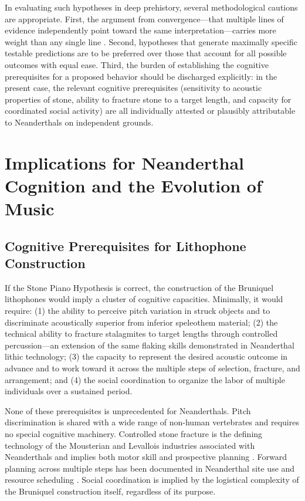 \documentclass[12pt]{article}
\begin{document}
In evaluating such hypotheses in deep prehistory, several methodological cautions are appropriate. First, the argument from convergence—that multiple lines of evidence independently point toward the same interpretation—carries more weight than any single line \citep{Wylie1989}. Second, hypotheses that generate maximally specific testable predictions are to be preferred over those that account for all possible outcomes with equal ease. Third, the burden of establishing the cognitive prerequisites for a proposed behavior should be discharged explicitly: in the present case, the relevant cognitive prerequisites (sensitivity to acoustic properties of stone, ability to fracture stone to a target length, and capacity for coordinated social activity) are all individually attested or plausibly attributable to Neanderthals on independent grounds.

\section{Implications for Neanderthal Cognition and the Evolution of Music}

\subsection{Cognitive Prerequisites for Lithophone Construction}

If the Stone Piano Hypothesis is correct, the construction of the Bruniquel lithophones would imply a cluster of cognitive capacities. Minimally, it would require: (1) the ability to perceive pitch variation in struck objects and to discriminate acoustically superior from inferior speleothem material; (2) the technical ability to fracture stalagmites to target lengths through controlled percussion—an extension of the same flaking skills demonstrated in Neanderthal lithic technology; (3) the capacity to represent the desired acoustic outcome in advance and to work toward it across the multiple steps of selection, fracture, and arrangement; and (4) the social coordination to organize the labor of multiple individuals over a sustained period.

None of these prerequisites is unprecedented for Neanderthals. Pitch discrimination is shared with a wide range of non-human vertebrates and requires no special cognitive machinery. Controlled stone fracture is the defining technology of the Mousterian and Levallois industries associated with Neanderthals and implies both motor skill and prospective planning \citep{Wil2019}. Forward planning across multiple steps has been documented in Neanderthal site use and resource scheduling \citep{Roebroeks2012}. Social coordination is implied by the logistical complexity of the Bruniquel construction itself, regardless of its purpose.
\end{document}
